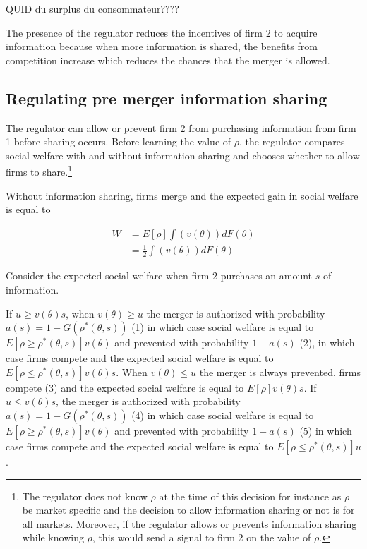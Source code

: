 \documentclass[a4paper,leqno]{article}%
\renewcommand{\t}{\theta}
\renewcommand{\t}{\theta}
\begin{document}
\medskip 

QUID du surplus du consommateur???? 

The presence of the regulator reduces the incentives of firm 2 to acquire information because when more information is shared, the benefits from competition increase which reduces the chances that the merger is allowed.

\medskip

\subsection{Regulating pre merger information sharing}

The regulator can allow or prevent firm 2 from purchasing information from firm 1 before sharing occurs. Before learning the value of $\rho$, the regulator compares social welfare with and without information sharing and chooses whether to allow firms to share.\footnote{The regulator does not know $\rho$ at the time of this decision for instance as $\rho$ be market specific and the decision to allow information sharing or not is for all markets. Moreover, if the regulator allows or prevents information sharing while knowing $\rho$, this would send a signal to firm 2 on the value of $\rho$.}

Without information sharing, firms merge and the expected gain in social welfare is equal to 

\begin{equation}
    \begin{aligned}
    W&=E[\rho]\int(v(\t))dF(\t)\\
    &=\frac{1}{2}\int(v(\t))dF(\t)
    \end{aligned}
\end{equation}

Consider the expected social welfare when firm 2 purchases an amount $s$ of information.

If $u\geq v(\t)s$, when $v(\t)\geq u$ the merger is authorized with probability $a(s)=1-G(\rho^*(\t,s))$ (1) in which case social welfare is equal to $E[\rho\geq \rho^*(\t,s)]v(\t)$ and prevented with probability $1-a(s)$ (2), in which case firms compete and the expected social welfare is equal to $E[\rho\leq \rho^*(\t,s)]v(\t)s$. When $v(\t)\leq u$ the merger is always prevented, firms compete (3) and the expected social welfare is equal to $E[\rho]v(\t)s$.
If $u\leq v(\t)s$, the merger is authorized with probability $a(s)=1-G(\rho^*(\t,s))$ (4) in which case social welfare is equal to $E[\rho\geq \rho^*(\t,s)]v(\t)$ and prevented with probability $1-a(s)$ (5) in which case firms compete and the expected social welfare is equal to $E[\rho\leq \rho^*(\t,s)]u$.
\end{document}
